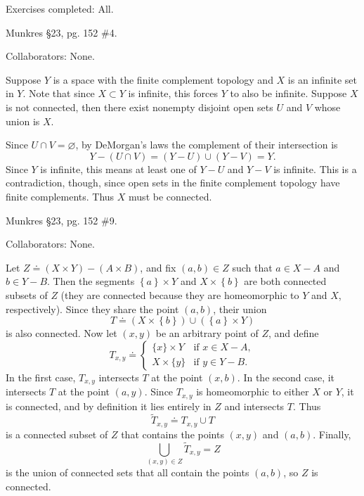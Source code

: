 \documentclass[10pt]{report}
\begin{document}

{\color{blue}Exercises completed: All.}

\begin{exer}[]
Munkres \S 23, pg. 152 \#4.
\end{exer}
{\color{blue}Collaborators: None.}

Suppose $Y$ is a space with the finite complement topology and $X$ is an infinite set in $Y$. Note that since $X \subset Y$ is infinite, this forces $Y$ to also be infinite. Suppose $X$ is not connected, then there exist nonempty disjoint open sets $U$ and $V$ whose union is $X$.

Since $U \cap V = \varnothing$, by DeMorgan's laws the complement of their intersection is
\[
	Y - (U \cap V) = (Y-U) \cup (Y-V) = Y.
\] Since $Y$ is infinite, this means at least one of $Y-U$ and $Y-V$ is infinite. This is a contradiction, though, since open sets in the finite complement topology have finite complements. Thus $X$ must be connected.

\begin{exer}[]
Munkres \S 23, pg. 152 \#9.
\end{exer}
{\color{blue}Collaborators: None.}

Let $Z \doteq (X \times Y) - (A \times B)$, and fix $(a,b) \in Z$ such that $a \in X-A$ and $b \in Y-B$. Then the segments $\left\{ a \right\}\times Y$ and $X \times \left\{ b \right\}$ are both connected subsets of $Z$ (they are connected because they are homeomorphic to $Y$ and $X$, respectively). Since they share the point $(a,b)$, their union
\[
	T \doteq (X \times \left\{ b \right\}) \cup (\left\{ a \right\}\times Y)
\] is also connected. Now let $(x,y)$ be an arbitrary point of $Z$, and define
\[
T_{x,y} \doteq
\begin{cases}
	\{x\} \times Y & \text{if } x \in X-A, \\
	X \times \{y\} & \text{if } y \in Y-B.
\end{cases}
\] 
In the first case, $T_{x,y}$ intersects $T$ at the point $(x,b)$. In the second case, it intersects $T$ at the point $(a,y)$. Since $T_{x,y}$ is homeomorphic to either $X$ or $Y$, it is connected, and by definition it lies entirely in $Z$ and intersects $T$. Thus
\[
	\tilde{T}_{x,y} \doteq T_{x,y} \cup T
\] is a connected subset of $Z$ that contains the points $(x,y)$ and $(a,b)$. Finally,
\[
	\bigcup_{(x,y) \in Z} \tilde{T}_{x,y} = Z
\] is the union of connected sets that all contain the points $(a,b)$, so $Z$ is connected.
\end{document}
